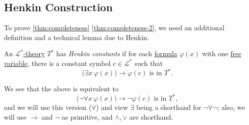 \subsection{Henkin Construction}
To prove \autoref{thm:completeness} \autoref{thm:completeness-2}, we need an additional definition and a technical lemma due to Henkin.

\begin{definition}\label{def:Henkin-constant}
	An \hyperref[def:theory]{\(\mathcal{L} ^{\ast} \)-theory} \(T^{\ast} \) has \emph{Henkin constants} if for each \hyperref[def:formula]{formula} \(\varphi (x)\) with one \hyperref[def:free-variable]{free variable}, there is a constant symbol \(c\in \mathcal{L} ^{\ast} \) such that
	\[
		\big( \exists x\ \varphi (x)\big) \to \varphi (c) \text{ is in \(T^{\ast} \)}.
	\]
\end{definition}

We see that the above is equivalent to
\[
	\big( \lnot \forall x\ \varphi (x)\big) \to  \lnot \varphi (c) \text{ is in \(T^{\ast} \)},
\]
and we will use this version (\(\forall \)) and view \(\exists \) being a shorthand for \(\lnot \forall \lnot \); also, we will use \(\to \) and \(\lnot \) as primitive, and \(\land , \lor \) are shorthand.

